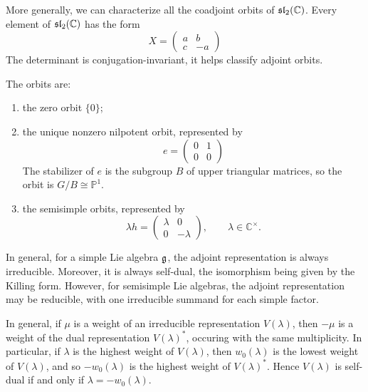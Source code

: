 \documentclass[12pt]{article}
\begin{document}
\begin{solution}
    More generally, we can characterize all the coadjoint orbits of $\mathfrak{sl}_2(\mathbb C)$. Every element of $\mathfrak{sl}_2(\mathbb C)$ has the form
    \[
        X=
        \begin{pmatrix}
            a & b  \\
            c & -a
        \end{pmatrix}\]The determinant is conjugation-invariant, it helps classify adjoint orbits.

    The orbits are:

    \begin{enumerate}
        \item the zero orbit $\{0\}$;
        \item the unique nonzero nilpotent orbit, represented by
              \[
                  e=
                  \begin{pmatrix}
                      0 & 1 \\
                      0 & 0
                  \end{pmatrix}
              \] The stabilizer of $e$ is the subgroup $B$ of upper triangular matrices, so the orbit is $G/B\cong \mathbb P^1$.
        \item the semisimple orbits, represented by
              \[
                  \lambda h=
                  \begin{pmatrix}
                      \lambda & 0        \\
                      0       & -\lambda
                  \end{pmatrix},
                  \qquad \lambda\in \mathbb C^\times.
              \]
    \end{enumerate}
    In general, for a simple Lie algebra $\mathfrak{g}$, the adjoint representation is always irreducible. Moreover, it is always self-dual, the isomorphism being given by the Killing form. However, for semisimple Lie algebras, the adjoint representation may be reducible, with one irreducible summand for each simple factor.

    In general, if $\mu$ is a weight of an irreducible representation $V(\lambda)$, then $-\mu$ is a weight of the dual representation $V(\lambda)^*$, occuring with the same multiplicity. In particular, if $\lambda$ is the highest weight of $V(\lambda)$, then $w_0(\lambda)$ is the lowest weight of $V(\lambda)$, and so $-w_0(\lambda)$ is the highest weight of $V(\lambda)^*$. Hence $V(\lambda)$ is self-dual if and only if $\lambda=-w_0(\lambda)$.
\end{solution}
\end{document}
